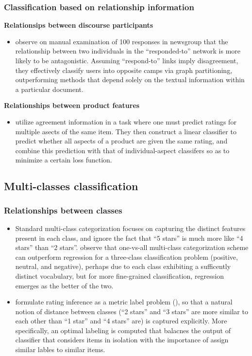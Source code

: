 \documentclass{article}
\begin{document}
\begin{multicols}{2}
    \subsubsection{Classification based  on relationship information}
      \textbf{Relationsips between discourse participants}
        \begin{itemize}
          \item \cite{Agrawal2003} observe on manual examination of 100
responses in newsgroup that the relationship between two individuals in the
``responded-to'' network is more likely to be antagonistic. Assuming
``respond-to'' links imply disagreement, they effectively classify users into
opposite camps via graph partitioning, outperforming methods that depend solely
on the textual information within a particular document.
        \end{itemize}

      \textbf{Relationships between product features}
        \begin{itemize}
          \item \cite{Snyder2007} utilize agreement information in a task where
one must predict ratings for multiple asects of the same item. They then
construct a linear classifier to predict whether all aspects of a product are
given the same rating, and combine this prediction with that of
individual-aspect classifers so as to minimize a certain loss function.
\cite{Snyder2007}
        \end{itemize}


  \subsection{Multi-classes classification}
    \subsubsection{Relationships between classes}
      \begin{itemize}
        \item Standard multi-class categorization focuses on capturing the
distinct features present in each class, and ignore the fact that ``5 stars'' is
much more like ``4 stars'' than ``2 stars''. \cite{Pang2005} observe that
one-vs-all multi-class categorization scheme can outperform regression for a
three-class classification problem (positive, neutral, and negative), perhaps
due to each class exhibiting a sufficently distinct vocabulary, but for more
fine-grained classification, regression emerges as the better of the two.
        \item \cite{Pang2005} formulate rating inference as a metric label
problem (\cite{Kleinberg2002}), so that a natural notion of distance between
classes (``2 stars'' and ``3 stars'' are more similar to each other than ``1
star'' and ``4 stars'' are) is captured explicitly. More specifically, an
optimal labeling is computed that balacnes the output of classifier that
considers items in isolation with the importance of assign similar lables to
similar items.
      \end{itemize}


\end{multicols}
\end{document}
